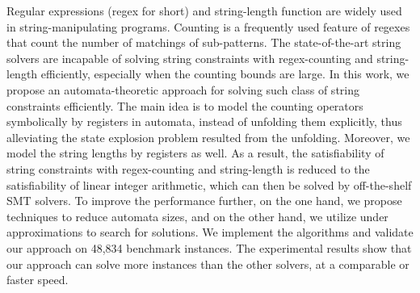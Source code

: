 
%

Regular expressions (regex for short) and string-length function are widely used in string-manipulating programs. 
Counting is a frequently used feature of regexes that count the number of matchings of sub-patterns. The state-of-the-art string solvers are incapable of solving string constraints with regex-counting and string-length efficiently, especially when the counting bounds are large. In this work, we propose an automata-theoretic approach for solving such class of string constraints efficiently. 
%
The main idea is to model the counting operators symbolically by registers in automata, instead of unfolding them explicitly, thus alleviating the state explosion problem resulted from the unfolding.  
%
Moreover, we model the string lengths by registers as well. 
As a result, the satisfiability of string constraints with regex-counting and string-length is reduced to the satisfiability of linear integer arithmetic, which can then be solved by off-the-shelf SMT solvers. 
%
%
To improve the performance further, on the one hand, we propose techniques to reduce automata sizes, 
and on the other hand, we utilize under approximations to search for solutions.   
We implement the algorithms and validate our approach on 48,834 benchmark instances. The experimental results show that 
our approach can solve more instances than the other solvers, at a comparable or faster speed.



%